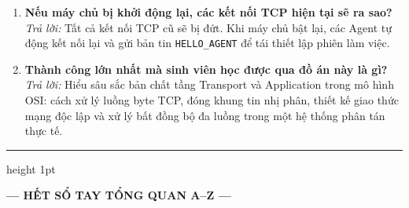 \documentclass[12pt,a4paper]{article}
\begin{document}
\begin{enumerate}[leftmargin=*, label=\textbf{Câu \arabic*:}]
  \item \textbf{Nếu máy chủ bị khởi động lại, các kết nối TCP hiện tại sẽ ra sao?} \\
    \textit{Trả lời:} Tất cả kết nối TCP cũ sẽ bị đứt. Khi máy chủ bật lại, các Agent tự động kết nối lại và gửi bản tin \texttt{HELLO\_AGENT} để tái thiết lập phiên làm việc.
  \item \textbf{Thành công lớn nhất mà sinh viên học được qua đồ án này là gì?} \\
    \textit{Trả lời:} Hiểu sâu sắc bản chất tầng Transport và Application trong mô hình OSI: cách xử lý luồng byte TCP, đóng khung tin nhị phân, thiết kế giao thức mạng độc lập và xử lý bất đồng bộ đa luồng trong một hệ thống phân tán thực tế.
\end{enumerate}

\begin{center}
  \vspace{10mm}
  {\color{lgDeepBlue}\hrule height 1pt}
  \vspace{4mm}
  {\bfseries\color{lgSlate} — HẾT SỔ TAY TỔNG QUAN A--Z —\par}
\end{center}
\end{document}
